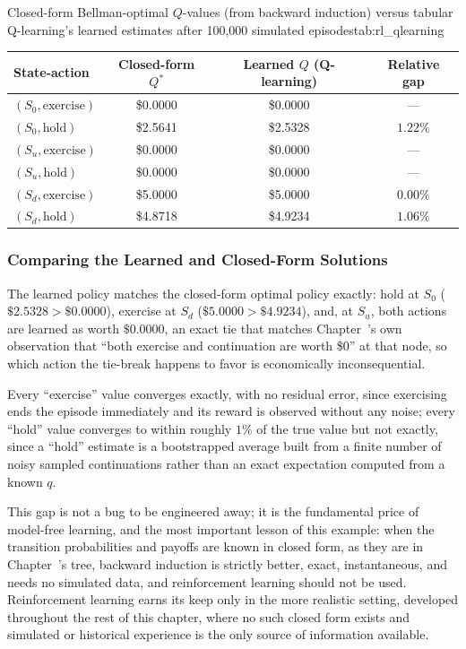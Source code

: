 \documentclass[../ai_in_finance]{subfiles}
\begin{document}
\begin{booktable}[htbp]{Closed-form Bellman-optimal $Q$-values (from backward induction) versus tabular Q-learning's learned estimates after 100,000 simulated episodes}{tab:rl_qlearning}
\begin{tabular}{lccc}
\toprule
State-action & Closed-form $Q^*$ & Learned $Q$ (Q-learning) & Relative gap \\
\midrule
$(S_0, \text{exercise})$ & \$0.0000 & \$0.0000 & --- \\
$(S_0, \text{hold})$ & \$2.5641 & \$2.5328 & $1.22\%$ \\
$(S_u, \text{exercise})$ & \$0.0000 & \$0.0000 & --- \\
$(S_u, \text{hold})$ & \$0.0000 & \$0.0000 & --- \\
$(S_d, \text{exercise})$ & \$5.0000 & \$5.0000 & $0.00\%$ \\
$(S_d, \text{hold})$ & \$4.8718 & \$4.9234 & $1.06\%$ \\
\bottomrule
\end{tabular}
\end{booktable}

\subsubsection*{Comparing the Learned and Closed-Form Solutions}

The learned policy matches the closed-form optimal policy exactly: hold at $S_0$ ($\$2.5328 > \$0.0000$), exercise at
$S_d$ ($\$5.0000 > \$4.9234$), and, at $S_u$, both actions are learned as worth $\$0.0000$, an exact tie that matches Chapter~'s own
observation that ``both exercise and continuation are worth \$0'' at that node, so which action the tie-break happens to favor is
economically inconsequential.

Every ``exercise'' value converges exactly, with no residual error, since exercising ends the episode
immediately and its reward is observed without any noise; every ``hold'' value converges to within roughly $1\%$ of the true value but
not exactly, since a ``hold'' estimate is a bootstrapped average built from a finite number of noisy sampled continuations rather than
an exact expectation computed from a known $q$.

This gap is not a bug to be engineered away; it is the fundamental price of model-free
learning, and the most important lesson of this example: when the transition probabilities and payoffs are
known in closed form, as they are in Chapter~'s tree, backward induction is strictly better, exact, instantaneous,
and needs no simulated data, and reinforcement learning should not be used. Reinforcement learning earns its keep only
in the more realistic setting, developed throughout the rest of this chapter, where no such closed form exists and simulated or
historical experience is the only source of information available.
\end{document}
